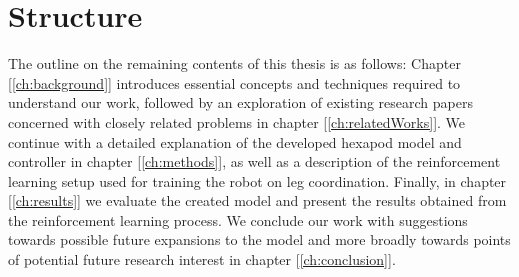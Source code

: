 %

\section{Structure}
The outline on the remaining contents of this thesis is as follows:
Chapter [\ref{ch:background}]  introduces essential concepts and techniques required to understand our work, followed by an exploration of existing research papers concerned with closely related problems in chapter [\ref{ch:relatedWorks}].
We continue with a detailed explanation of the developed hexapod model and controller in chapter [\ref{ch:methods}], as well as a description of the reinforcement learning setup used for training the robot on leg coordination.
Finally, in chapter [\ref{ch:results}] we evaluate the created model and present the results obtained from the reinforcement learning process.
We conclude our work with suggestions towards possible future expansions to the model and more broadly towards points of potential future research interest in chapter [\ref{ch:conclusion}].